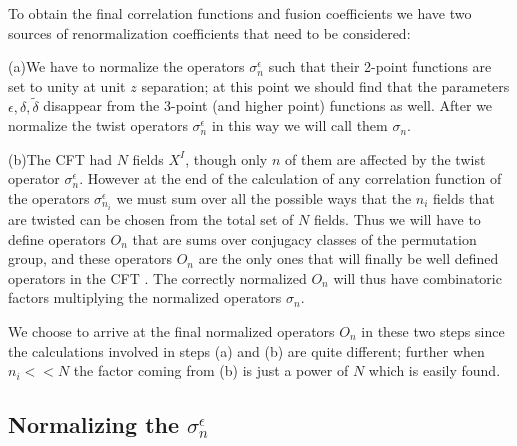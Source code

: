 \documentclass[12pt]{article}
\begin{document}
      To obtain the final
correlation functions and fusion coefficients we have two sources of
renormalization coefficients that need to be considered:

(a)\quad We have to normalize the  operators $\sigma^\epsilon_n$ such
that their 2-point functions are set to
unity at unit $z$ separation; at this point we should find that the
parameters $\epsilon, \delta, \tilde \delta$ disappear from
the 3-point (and higher point) functions as well. After we normalize
the twist operators $\sigma^\epsilon_n$ in this way we
will call them $\sigma_n$.

(b)\quad The CFT had $N$ fields $X^I$, though only $n$ of them are
affected by the twist operator $\sigma^\epsilon_n$.
However at the end of the calculation of any correlation function of
the operators $\sigma^\epsilon_{n_i}$ we must sum
over all the possible ways that the $n_i$ fields that are twisted can
be chosen from the total set of $N$ fields. Thus we will
have to define operators $O_n$ that are sums over conjugacy classes
of the permutation group, and these operators $O_n$
are the only ones that will finally be well defined operators in the
CFT \cite{vafaorb}.  The correctly normalized $O_n$ will thus have
combinatoric factors multiplying the normalized operators $\sigma_n$.

We choose to arrive at the final normalized operators $O_n$ in these
two steps since the calculations involved in steps (a)
and (b) are quite different; further when $n_i<<N$ the factor coming
from (b)  is just a   power of $N$ which is easily found.

\subsection{Normalizing the $\sigma^\epsilon_n$}
\label{SecNorm}
\end{document}
